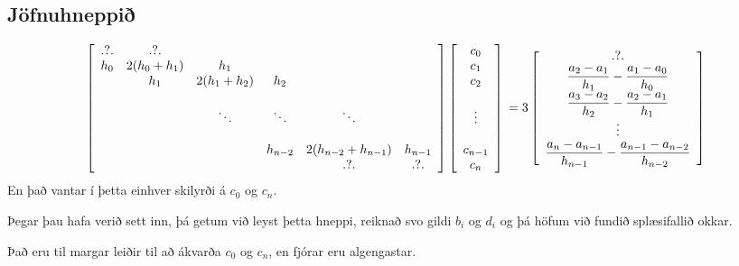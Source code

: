 \documentclass[A4paper,10pt,icelandic]{sphinxmanual}
\begin{document}
\subsection{Jöfnuhneppið}
\label{kafli03:jofnuhneppi}\[
    \left[ \begin{array}{cccccc}
    .\text{?}.  & .\text{?}.       &&&& \\ 
    h_0 & 2(h_0+h_1) & h_1 &&&\\
        & h_1        & 2(h_1+h_2) & h_2 &&\\
        &&&&&\\
        &            & \ddots      & \ddots & \ddots &\\
        &&&&&\\
        &  &  & h_{n-2}  & 2(h_{n-2} + h_{n-1}) & h_{n-1}
        \\ 
        &  &  &   & .?.    & .?.
    \end{array} \right]
    \left[ \begin{array}{c}
    c_0 \\ 
    c_1 \\
    c_2 \\
    \\
    \vdots \\
    \\
    c_{n-1} \\ 
    c_n
    \end{array} \right]
    \\
    = 3\left[ \begin{array}{c}
    .?. \\
    \dfrac{a_2-a_1}{h_1} - \dfrac{a_1-a_0}{h_0} \\
    \dfrac{a_3-a_2}{h_2} - \dfrac{a_2-a_1}{h_1} \\
    \vdots \\
    \dfrac{a_n-a_{n-1}}{h_{n-1}}
        - \dfrac{a_{n-1}-a_{n-2}}{h_{n-2}}
    \\ 
    \end{array} \right]\]
En það vantar í þetta einhver skilyrði á \(c_0\) og \(c_n\).

Þegar þau hafa verið sett inn, þá getum við leyst þetta hneppi, reiknað svo
gildi \(b_i\) og \(d_i\) og þá höfum við fundið splæsifallið
okkar.

Það eru til margar leiðir til að ákvarða \(c_0\) og \(c_n\), en
fjórar eru algengastar.
\end{document}
